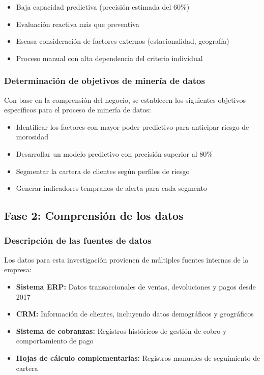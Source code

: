 \begin{itemize}
    \item Baja capacidad predictiva (precisión estimada del 60\%)
    \item Evaluación reactiva más que preventiva
    \item Escasa consideración de factores externos (estacionalidad, geografía)
    \item Proceso manual con alta dependencia del criterio individual
\end{itemize}

\subsubsection{Determinación de objetivos de minería de datos}
Con base en la comprensión del negocio, se establecen los siguientes objetivos específicos para el proceso de minería de datos:

\begin{itemize}
    \item Identificar los factores con mayor poder predictivo para anticipar riesgo de morosidad
    \item Desarrollar un modelo predictivo con precisión superior al 80\%
    \item Segmentar la cartera de clientes según perfiles de riesgo
    \item Generar indicadores tempranos de alerta para cada segmento
\end{itemize}

\subsection{Fase 2: Comprensión de los datos}
\subsubsection{Descripción de las fuentes de datos}
Los datos para esta investigación provienen de múltiples fuentes internas de la empresa:

\begin{itemize}
    \item \textbf{Sistema ERP:} Datos transaccionales de ventas, devoluciones y pagos desde 2017
    \item \textbf{CRM:} Información de clientes, incluyendo datos demográficos y geográficos
    \item \textbf{Sistema de cobranzas:} Registros históricos de gestión de cobro y comportamiento de pago
    \item \textbf{Hojas de cálculo complementarias:} Registros manuales de seguimiento de cartera
\end{itemize}

